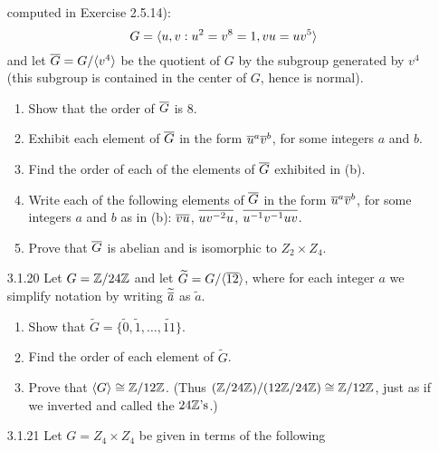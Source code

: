 \begin{enumerate}
                  computed in Exercise 2.5.14):
                  $$G = \langle u, v : u^2 = v^8 = 1, vu = uv^5 \rangle$$
                  and let $\overline{G} = G/\langle v^4 \rangle$ be the quotient of $G$ by
                  the subgroup generated by $v^4$ (this subgroup is contained in
                  the center of $G$, hence is normal).
                  \begin{enumerate}
                     \item Show that the order of $\overline{G}$ is 8.
                     \item Exhibit each element of $\overline{G}$ in the form
                           $\overline{u}^a\overline{v}^b$, for some integers $a$ and $b$.
                     \item Find the order of each of the elements of $\overline{G}$
                           exhibited in (b).
                     \item Write each of the following elements of $\overline{G}$ in
                           the form $\overline{u}^a\overline{v}^b$, for some integers $a$ and
                           $b$ as in (b): \quad $\overline{vu}$, \quad $\overline{uv^{-2}u}$,
                           \quad $\overline{u^{-1}v^{-1}uv}$.
                     \item Prove that $\overline{G}$ is abelian and is isomorphic to
                           $Z_2 \times Z_4$.
                  \end{enumerate}
   \item[3.1.20]  Let $G = \mathbb{Z}/24\mathbb{Z}$ and let
                  $\widetilde{G} = G/\langle \overline{12} \rangle$, where for each integer $a$
                  we simplify notation by writing $\widetilde{\overline{a}}$ as
                  $\widetilde{a}$.
                  \begin{enumerate}
                     \item Show that $\widetilde{G} = \{\widetilde{0},
                           \widetilde{1}, \ldots, \widetilde{11}\}$.
                     \item Find the order of each element of $\widetilde{G}$.
                     \item Prove that $\langle G \rangle \cong \mathbb{Z}/12\mathbb{Z}$. (Thus
                           $(\mathbb{Z}/24\mathbb{Z})/(12\mathbb{Z}/24\mathbb{Z}) \cong \mathbb{Z}/12\mathbb{Z}$, just as if we
                           inverted and called the $24\mathbb{Z}\text{'s}$.)
                  \end{enumerate}
   \item[3.1.21]  Let $G = Z_4 \times Z_4$ be given in terms of the following

\end{enumerate}

